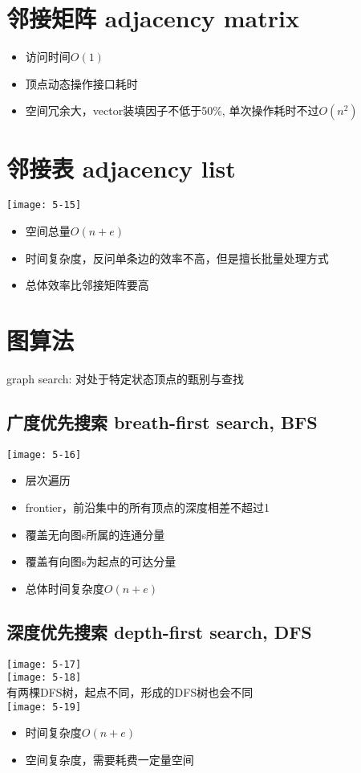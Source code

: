 \section{邻接矩阵 adjacency matrix}
\begin{itemize}
\item 访问时间$O(1)$
\item 顶点动态操作接口耗时
\item 空间冗余大，vector装填因子不低于50\%, 单次操作耗时不过$O(n^2)$
\end{itemize}

\section{邻接表 adjacency list}
\texttt{[image: 5-15]}
\begin{itemize}
\item 空间总量$O(n+e)$
\item 时间复杂度，反问单条边的效率不高，但是擅长批量处理方式
\item 总体效率比邻接矩阵要高
\end{itemize}

\section{图算法}
graph search: 对处于特定状态顶点的甄别与查找
\subsection{广度优先搜索 breath-first search, BFS}
\texttt{[image: 5-16]}
\begin{itemize}
\item 层次遍历
\item frontier，前沿集中的所有顶点的深度相差不超过1
\item 覆盖无向图s所属的连通分量
\item 覆盖有向图s为起点的可达分量
\item 总体时间复杂度$O(n+e)$
\end{itemize}

\subsection{深度优先搜索 depth-first search, DFS}
\texttt{[image: 5-17]}\\
\texttt{[image: 5-18]}\\

有两棵DFS树，起点不同，形成的DFS树也会不同\\
\texttt{[image: 5-19]}
\begin{itemize}
\item 时间复杂度$O(n+e)$
\item 空间复杂度，需要耗费一定量空间
\end{itemize}

